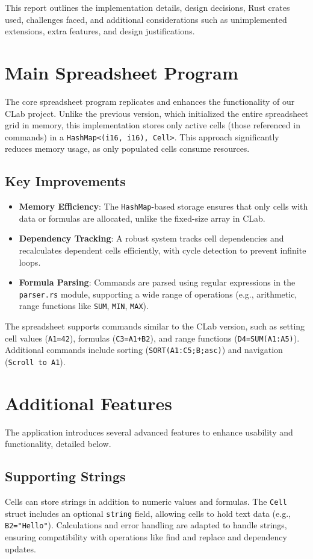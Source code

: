 \documentclass{article}
\begin{document}
This report outlines the implementation details, design decisions, Rust crates used, challenges faced, and additional considerations such as unimplemented extensions, extra features, and design justifications.

\section{Main Spreadsheet Program}
The core spreadsheet program replicates and enhances the functionality of our CLab project. Unlike the previous version, which initialized the entire spreadsheet grid in memory, this implementation stores only active cells (those referenced in commands) in a \texttt{HashMap<(i16, i16), Cell>}. This approach significantly reduces memory usage, as only populated cells consume resources.

\subsection{Key Improvements}
\begin{itemize}
    \item \textbf{Memory Efficiency}: The \texttt{HashMap}-based storage ensures that only cells with data or formulas are allocated, unlike the fixed-size array in CLab.
    \item \textbf{Dependency Tracking}: A robust system tracks cell dependencies and recalculates dependent cells efficiently, with cycle detection to prevent infinite loops.
    \item \textbf{Formula Parsing}: Commands are parsed using regular expressions in the \texttt{parser.rs} module, supporting a wide range of operations (e.g., arithmetic, range functions like \texttt{SUM}, \texttt{MIN}, \texttt{MAX}).
\end{itemize}

The spreadsheet supports commands similar to the CLab version, such as setting cell values (\texttt{A1=42}), formulas (\texttt{C3=A1+B2}), and range functions (\texttt{D4=SUM(A1:A5)}). Additional commands include sorting (\texttt{SORT(A1:C5;B;asc)}) and navigation (\texttt{Scroll to A1}).

\section{Additional Features}
The application introduces several advanced features to enhance usability and functionality, detailed below.

\subsection{Supporting Strings}
Cells can store strings in addition to numeric values and formulas. The \texttt{Cell} struct includes an optional \texttt{string} field, allowing cells to hold text data (e.g., \texttt{B2="Hello"}). Calculations and error handling are adapted to handle strings, ensuring compatibility with operations like find and replace and dependency updates.
\end{document}
